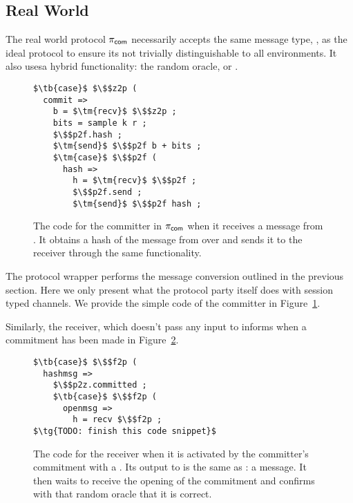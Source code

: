 \subsection{Real World}
The real world protocol $\pi_{{\mathsf {com}}}$ necessarily accepts the same message type, , as the ideal protocol to ensure its not trivially distinguishable to all environments. 
It also usesa hybrid functionality: the random oracle, or \Fro.

\begin{figure}
\begin{lstlisting}[basicstyle=\small\BeraMonottFamily, frame=single, mathescape]
$\tb{case}$ $\$$z2p (
  commit => 
    b = $\tm{recv}$ $\$$z2p ;
    bits = sample k r ;
    $\$$p2f.hash ;
    $\tm{send}$ $\$$p2f b + bits ;
    $\tm{case}$ $\$$p2f (
      hash => 
        h = $\tm{recv}$ $\$$p2f ;
        $\$$p2f.send ;
        $\tm{send}$ $\$$p2f hash ;
\end{lstlisting}
\caption{The code for the committer in $\pi_{{\mathsf {com}}}$ when it receives a  message from \Z. It obtains a hash of the message from \Fro over  and sends it to the receiver through the same functionality.}
\label{lst:committer}
\end{figure}

The protocol wrapper performs the message conversion outlined in the previous section. Here we only present what the protocol party itself does with session typed channels. 
We provide the simple code of the committer in Figure~\ref{lst:committer}.

Similarly, the receiver, which doesn't pass any input to \Fro informs \Z when a commitment has been made in Figure~\ref{lst:receiver}.
\begin{figure}
\begin{lstlisting}[basicstyle=\small\BeraMonottFamily, frame=single, mathescape]
$\tb{case}$ $\$$f2p (
  hashmsg => 
    $\$$p2z.committed ;
    $\tb{case}$ $\$$f2p (
      openmsg => 
        h = recv $\$$f2p ;
$\tg{TODO: finish this code snippet}$
\end{lstlisting}
\caption{The code for the receiver when it is activated by the committer's commitment with a . Its output to \Z is the same as \Fcom: a  message. It then waits to receive the opening of the commitment and confirms with that random oracle that it is correct.}
\label{lst:receiver}
\end{figure}

